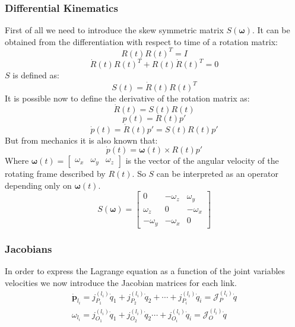 \subsubsection{Differential Kinematics}
First of all we need to introduce the skew symmetric matrix $S(\boldsymbol{\omega})$. It can be obtained from the differentiation with respect to time of a rotation matrix:
\begin{equation}
	R(t)R(t)^T=I
\end{equation}
\begin{equation}
	\dot{R}(t)R(t)^T+R(t)\dot{R}(t)^T=0
\end{equation}
$S$ is defined as:
\begin{equation}
	S(t) = \dot{R}(t)R(t)^T
\end{equation}
It is possible now to define the derivative of the rotation matrix as:
\begin{equation}
	\dot{R}\left(t\right)=S\left(t\right)R(t)
\end{equation}
\begin{equation}
	p\left(t\right)=R\left(t\right)p'
\end{equation}
\begin{equation}
	\dot{p}\left(t\right)=\dot{R}\left(t\right)p'=S(t)R\left(t\right)p'
\end{equation}
But from mechanics it is also known that:
\begin{equation}
	\dot{p}\left(t\right)=\boldsymbol{\omega}(t)\times R\left(t\right)p'
\end{equation}
Where $\boldsymbol{\omega}\left(t\right)=\left[\begin{matrix}\omega_x&\omega_y&\omega_z\end{matrix}\right]$ is the vector of the angular velocity of the rotating frame described by $R(t)$.
So $S$ can be interpreted as an operator depending only on $\boldsymbol{\omega}\left(t\right)$.
\begin{equation}
	S\left(\boldsymbol{\omega}\right)=\left[
	\begin{matrix}
	0&-\omega_z&\omega_y\\\omega_z&0&-\omega_x\\-\omega_y&{-\omega}_x&0
	\end{matrix}\right]
\end{equation}

\subsubsection{Jacobians}\label{jacobians}
In order to express the Lagrange equation as a function of the joint variables velocities we now introduce the Jacobian matrices for each link.
\begin{align}
	{\dot{\mathbf{p}}}_{l_i}=\mathit{j}_{P_1}^{(l_i)}{\dot{q}}_1+\mathit{j}_{P_2}^{(l_i)}{\dot{q}}_2+\cdots+\mathit{j}_{P_i}^{\left(l_i\right)}{\dot{q}}_i=\mathcal{J}_P^{(l_i)}\dot{q}
	\\
	\omega_{l_i}=\mathit{j}_{O_1}^{(l_i)}{\dot{q}}_1+\mathit{j}_{O_2}^{(l_i)}{\dot{q}}_2\cdots+\mathit{j}_{O_i}^{\left(l_i\right)}{\dot{q}}_i=\mathcal{J}_O^{(l_i)}\dot{q}
\end{align}

